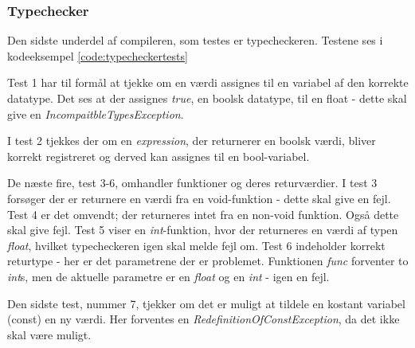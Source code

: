 \subsubsection{Typechecker}
Den sidste underdel af compileren, som testes er typecheckeren. Testene ses i kodeeksempel \ref{code:typecheckertests}


\noindent Test 1 har til formål at tjekke om en værdi assignes til en variabel af den korrekte datatype. Det ses at der assignes \textit{true}, en boolsk datatype, til en float - dette skal give en \textit{IncompaitbleTypesException}.

I test 2 tjekkes der om en \textit{expression}, der returnerer en boolsk værdi, bliver korrekt registreret og derved kan assignes til en bool-variabel. 

De næste fire, test 3-6, omhandler funktioner og deres returværdier. I test 3 forsøger der er returnere en værdi fra en void-funktion - dette skal give en fejl. Test 4 er det omvendt; der returneres intet fra en non-void funktion. Også dette skal give fejl. Test 5 viser en \textit{int}-funktion, hvor der returneres en værdi af typen \textit{float}, hvilket typecheckeren igen skal melde fejl om. Test 6 indeholder korrekt returtype - her er det parametrene der er problemet. Funktionen \textit{func} forventer to \textit{int}s, men de aktuelle parametre er en \textit{float} og en \textit{int} - igen en fejl.

Den sidste test, nummer 7,  tjekker om det er muligt at tildele en kostant variabel (const) en ny værdi. Her forventes en \textit{RedefinitionOfConstException}, da det ikke skal være muligt.